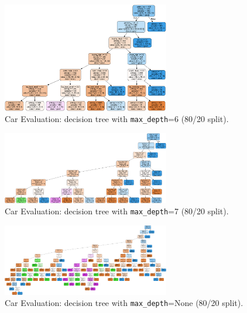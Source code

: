 \begin{figure}[H]
	\centering
	\includegraphics[width=0.65\textwidth]{imgs/dt-mini/dt__car_evaluation__80_vs_20__6.png}
	\caption{Car Evaluation: decision tree with \texttt{max\_depth}=6 (80/20 split).}\label{fig:ce-dt-depth-6}
\end{figure}

\begin{figure}[H]
	\centering
	\includegraphics[width=0.65\textwidth]{imgs/dt-mini/dt__car_evaluation__80_vs_20__7.png}
	\caption{Car Evaluation: decision tree with \texttt{max\_depth}=7 (80/20 split).}\label{fig:ce-dt-depth-7}
\end{figure}

\begin{figure}[H]
	\centering
	\includegraphics[width=0.65\textwidth]{imgs/dt-mini/dt__car_evaluation__80_vs_20__None.png}
	\caption{Car Evaluation: decision tree with \texttt{max\_depth}=None (80/20 split).}\label{fig:ce-dt-depth-none}
\end{figure}

